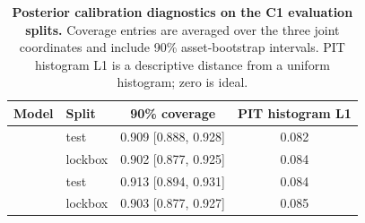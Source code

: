 \begin{table}[tb]
\centering
\caption{\textbf{Posterior calibration diagnostics on the C1 evaluation splits.} Coverage entries are averaged over the three joint coordinates and include 90\% asset-bootstrap intervals. PIT histogram L1 is a descriptive distance from a uniform histogram; zero is ideal.}
\label{tab:calibration}
\begin{tabular}{llcc}
\toprule
Model & Split & 90\% coverage & PIT histogram L1 \\
\midrule
\propdirect{} & test & 0.909 [0.888, 0.928] & 0.082 \\
\propdirect{} & lockbox & 0.902 [0.877, 0.925] & 0.084 \\
\bstdprob{} & test & 0.913 [0.894, 0.931] & 0.084 \\
\bstdprob{} & lockbox & 0.903 [0.877, 0.927] & 0.085 \\
\bottomrule
\end{tabular}
\end{table}
